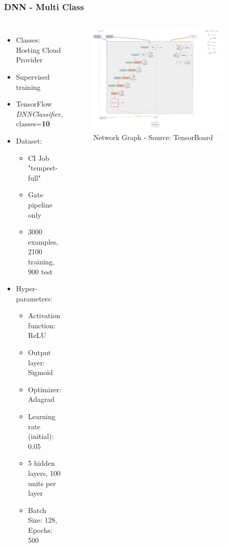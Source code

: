 \documentclass[aspectratio=169,11pt,hyperref={colorlinks=true}]{beamer}
\begin{document}
\begin{frame}
    \frametitle{DNN - Multi Class}
    \begin{columns}
        \begin{itemize}
            \item{Classes: Hosting Cloud Provider}
            \item{Supervised training}
            \item{TensorFlow \emph{DNNClassifier}, classes=\textbf{10}}
            \item{Dataset:}
            \begin{itemize}
              \item{CI Job "tempest-full"}
              \item{Gate pipeline only}
              \item{3000 examples, 2100 training, 900 test}
            \end{itemize}
            \item{Hyper-parameters:}
            \begin{itemize}
              \item{Activation function: ReLU}
              \item{Output layer: Sigmoid}
              \item{Optimizer: Adagrad}
              \item{Learning rate (initial): 0.05}
              \item{5 hidden layers, 100 units per layer}
              \item{Batch Size: 128, Epochs: 500}
            \end{itemize}
        \end{itemize}
        \begin{figure}
        \begin{center}
          \includegraphics[width=0.9\textwidth]{diagrams/binary_class_network_diagram.png}
             \caption{Network Graph - Source: TensorBoard}
        \end{center}
        \end{figure}
    \end{columns}
\end{frame}
\end{document}
